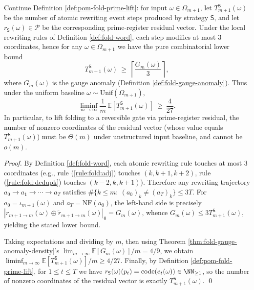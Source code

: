 \begin{corollary}\label{cor:pom-prime-residual-linear-lb}
Continue Definition \ref{def:pom-fold-prime-lift}: for input $\omega\in\Omega_{m+1}$, let $T_{m+1}^{\mathsf S}(\omega)$ be the number of atomic rewriting event steps produced by strategy $\mathsf S$, and let $r_{\mathsf S}(\omega)\in\mathcal P$ be the corresponding prime-register residual vector.
Under the local rewriting rules of Definition \ref{def:fold-word}, each step modifies at most $3$ coordinates, hence for any $\omega\in\Omega_{m+1}$ we have the pure combinatorial lower bound
\[
T_{m+1}^{\mathsf S}(\omega)\ \ge\ \left\lceil \frac{G_m(\omega)}{3}\right\rceil ,
\]
where $G_m(\omega)$ is the gauge anomaly (Definition \ref{def:fold-gauge-anomaly}).
Thus under the uniform baseline $\omega\sim\mathrm{Unif}(\Omega_{m+1})$,
\[
\liminf_{m\to\infty}\frac{1}{m}\,\mathbb E\!\left[T_{m+1}^{\mathsf S}(\omega)\right]\ \ge\ \frac{4}{27}.
\]
In particular, to lift folding to a reversible gate via prime-register residual, the number of nonzero coordinates of the residual vector (whose value equals $T_{m+1}^{\mathsf S}(\omega)$) must be $\Theta(m)$ under unstructured input baseline, and cannot be $o(m)$.
\end{corollary}
\begin{proof}
By Definition \ref{def:fold-word}, each atomic rewriting rule touches at most $3$ coordinates (e.g., rule (\ref{rule:fold:adj}) touches $(k,k{+}1,k{+}2)$, rule (\ref{rule:fold:dedupk}) touches $(k{-}2,k,k{+}1)$).
Therefore any rewriting trajectory $a_0\to a_1\to\cdots\to a_T$ satisfies
\(
\#\{k\le m:\ (a_0)_k\neq (a_T)_k\}\le 3T
\).
For $a_0=\iota_{m+1}(\omega)$ and $a_T=\mathrm{NF}(a_0)$, the left-hand side is precisely
\(
|r_{m+1\to m}(\omega)\oplus \widetilde r_{m+1\to m}(\omega)|_0=G_m(\omega)
\),
whence $G_m(\omega)\le 3T_{m+1}^{\mathsf S}(\omega)$, yielding the stated lower bound.
\par
Taking expectations and dividing by $m$, then using Theorem \ref{thm:fold-gauge-anomaly-density}'s
\(
\lim_{m\to\infty}\mathbb E[G_m(\omega)]/m=4/9
\),
we obtain $\liminf_{m\to\infty}\mathbb E[T_{m+1}^{\mathsf S}(\omega)]/m\ge 4/27$.
Finally, by Definition \ref{def:pom-fold-prime-lift}, for $1\le t\le T$ we have $r_{\mathsf S}(\omega)(p_t)=\mathrm{code}(e_t(\omega))\in\NN_{\ge 1}$, so the number of nonzero coordinates of the residual vector is exactly $T_{m+1}^{\mathsf S}(\omega)$. \qed
\end{proof}

